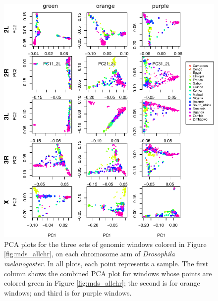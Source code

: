 \documentclass[11pt, oneside]{article}   	%
\begin{document}
\begin{figure}
    \begin{center}
       \includegraphics[width=1\textwidth]{Fig2_pca_plots_allchr_3peaks_label_update}
    \end{center}
    \caption{      
        PCA plots for the three sets of genomic windows colored in Figure \ref{fig:mds_allchr},
        on each chromosome arm of \textit{Drosophila melanogaster}.
        In all plots, each point represents a sample. 
        The first column shows the combined PCA plot for windows 
        whose points are colored green in Figure \ref{fig:mds_allchr}; 
        the second is for orange windows; 
        and third is for purple windows.
         \label{fig:pca_by_pop}
    }
\end{figure}
\end{document}
